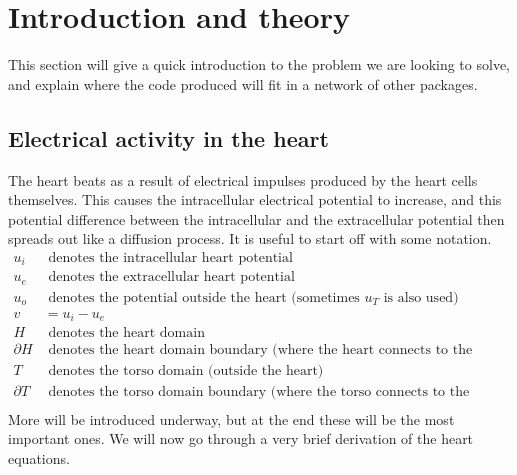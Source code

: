 \section{Introduction and theory}
This section will give a quick introduction to the problem we are looking to solve, and explain where the code produced will fit in a network of other packages. 

\subsection{Electrical activity in the heart}
The heart beats as a result of electrical impulses produced by the heart cells themselves. This causes the intracellular electrical potential to increase, and this potential difference between the intracellular and the extracellular potential then spreads out like a diffusion process. It is useful to start off with some notation. 
\begin{align*}
 u_i & \text{ denotes the intracellular heart potential} \\
 u_e & \text{ denotes the extracellular heart potential}\\
 u_o & \text{ denotes the potential outside the heart (sometimes $u_T$ is also used)} \\
 v & = u_i-u_e \\
 H & \text{ denotes the heart domain} \\
 \partial H & \text{ denotes the heart domain boundary (where the heart connects to the torso)} \\
 T & \text{ denotes the torso domain (outside the heart)} \\ 
 \partial T & \text{ denotes the torso domain boundary (where the torso connects to the surroundings)} \\ 
\end{align*}
More will be introduced underway, but at the end these will be the most important ones. We will now go through a very brief derivation of the heart equations. 

